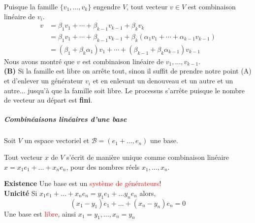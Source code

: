Puisque la famille $\{v_1, \dots, v_k\}$ engendre $V$, tout vecteur $v \in V$ est combinaison linéaire de $v_i$.
\begin{align*}
v &= \beta_1 v_1 + \cdots + \beta_{k-1} v_{k-1} + \beta_k v_k \\
  &= \beta_1 v_1 + \cdots + \beta_{k-1} v_{k-1} + \beta_k (\alpha_1 v_1 + \cdots + \alpha_{k-1} v_{k-1}) \\
  &= (\beta_1 + \beta_k \alpha_1) v_1 + \cdots + (\beta_{k-1} + \beta_k \alpha_{k-1}) v_{k-1}
\end{align*}
Nous avons montré que $v$ est combinaison linéaire de $v_1, \dots, v_{k-1}$.
\\
\textbf{(B)} Si la famille est libre on arrête tout, sinon il suffit de prendre notre point (A) et d'enlever un générateur $v_i$ et en enlevant un denouveau et un autre et un autre... jusqu'à que la famille soit libre. Le processus s'arrête puisque le nombre de vecteur au départ est \textbf{fini}.









\subparagraph{Combinéaisons linéaires d'une base}
Soit $V$ un espace vectoriel et $\mathcal{B} = (e_1 + \dots, e_n)$ une base.
\begin{theoreme}
    Tout vecteur $x$ de $V$ s'écrit de manière unique comme combinaison linéaire $x = x_1e_1 + \dots + x_ne_n$, pour des nombres réels $x_1, \dots, x_n$.
\end{theoreme}
\textbf{Existence} Une base est un \textcolor{red}{système de générateurs}!
\\
\textbf{Unicité} Si $x_1e_1 + \dots + x_ne_n = y_1e_1 + \dots y_ne_n$ alors, 
\[(x_1 - y_1)e_1 + \dots +(x_n - y_n)e_n = 0\]
Une base est \textcolor{red}{libre}, ainsi $x_1 = y_1, \dots, x_n = y_n$
